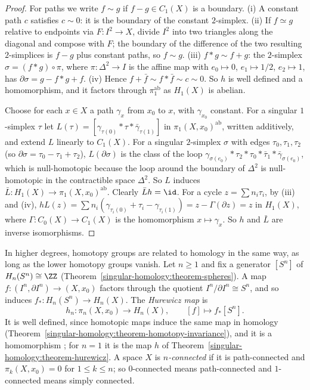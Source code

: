 \begin{proof}
For paths we write $f \sim g$ if $f - g \in C_1(X)$ is a boundary. (i) A constant path $c$ satisfies $c \sim 0$: it is the boundary of the constant $2$-simplex.
(ii) If $f \simeq g$ relative to endpoints via $F \colon I^2 \to X$, divide $I^2$ into two triangles along the diagonal and compose with $F$; the boundary of the
difference of the two resulting $2$-simplices is $f - g$ plus constant paths, so $f \sim g$. (iii) $f * g \sim f + g$: the $2$-simplex $\sigma = (f * g) \circ \pi$, where
$\pi \colon \Delta^2 \to I$ is the affine map with $e_0 \mapsto 0$, $e_1 \mapsto 1/2$, $e_2 \mapsto 1$, has $\partial\sigma = g - f * g + f$. (iv) Hence
$f + \bar f \sim f * \bar f \sim c \sim 0$. So $h$ is well defined and a homomorphism, and it factors through $\pi_1^{\mathrm{ab}}$ as $H_1(X)$ is abelian.

Choose for each $x \in X$ a path $\gamma_x$ from $x_0$ to $x$, with $\gamma_{x_0}$ constant. For a singular $1$-simplex $\tau$ let $L(\tau) = [\gamma_{\tau(0)} * \tau * \bar\gamma_{\tau(1)}]$
in $\pi_1(X, x_0)^{\mathrm{ab}}$, written additively, and extend $L$ linearly to $C_1(X)$. For a singular $2$-simplex $\sigma$ with edges $\tau_0, \tau_1, \tau_2$ (so
$\partial\sigma = \tau_0 - \tau_1 + \tau_2$), $L(\partial\sigma)$ is the class of the loop $\gamma_{\sigma(e_0)} * \tau_2 * \tau_0 * \bar\tau_1 * \bar\gamma_{\sigma(e_0)}$, which is
null-homotopic because the loop around the boundary of $\Delta^2$ is null-homotopic in the contractible space $\Delta^2$. So $L$ induces
$\bar L \colon H_1(X) \to \pi_1(X, x_0)^{\mathrm{ab}}$. Clearly $\bar L h = \id$. For a cycle $z = \sum n_i\tau_i$, by (iii) and (iv),
$hL(z) = \sum n_i(\gamma_{\tau_i(0)} + \tau_i - \gamma_{\tau_i(1)}) = z - \Gamma(\partial z) = z$ in $H_1(X)$, where $\Gamma \colon C_0(X) \to C_1(X)$ is the homomorphism $x \mapsto \gamma_x$.
So $h$ and $\bar L$ are inverse isomorphisms.
\end{proof}

In higher degrees, homotopy groups are related to homology in the same way, as long as the lower homotopy groups vanish. Let $n \geq 1$ and fix a generator $[S^n]$ of
$H_n(S^n) \cong \ZZ$ (Theorem~\ref{singular-homology:theorem-spheres}). A map $f \colon (I^n, \partial I^n) \to (X, x_0)$ factors through the quotient $I^n/\partial I^n \cong S^n$, and so
induces $f_* \colon H_n(S^n) \to H_n(X)$. The \emph{Hurewicz map} is
\[
h_n \colon \pi_n(X, x_0) \to H_n(X), \qquad [f] \mapsto f_*[S^n] .
\]
It is well defined, since homotopic maps induce the same map in homology (Theorem~\ref{singular-homology:theorem-homotopy-invariance}), and it is a homomorphism \cite[Section 4.2]{hatcher-at}; for $n = 1$ it is the map $h$ of
Theorem~\ref{singular-homology:theorem-hurewicz}. A space $X$ is \emph{$n$-connected} if it is path-connected and $\pi_k(X, x_0) = 0$ for $1 \leq k \leq n$; so $0$-connected means
path-connected and $1$-connected means simply connected.

